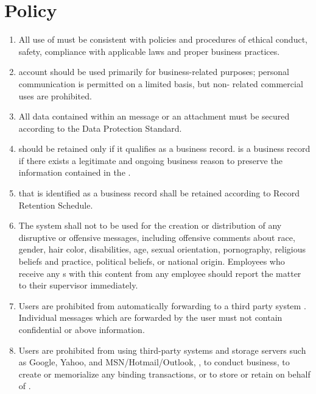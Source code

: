 \section{Policy}
\begin{enumerate}
\item 
All use of \email{} must be consistent with \CompanyName{} policies and procedures of ethical conduct, safety, compliance with applicable laws\oxford{} and proper business practices.
\item 
\CompanyName{} \email{} account should be used primarily for \CompanyName{} business-related purposes; personal communication is permitted on a limited basis, but non-\CompanyName{} related commercial uses are prohibited.
\item 
All \CompanyName{} data contained within an \email{} message or an attachment must be secured according to the Data Protection Standard.%
\item 
\Email{} should be retained only if it qualifies as a \CompanyName{} business record.  
\Email{} is a \CompanyName{} business record if there exists a legitimate and ongoing business reason to preserve the information contained in the \email{}.
\item 
\Email{} that is identified as a \CompanyName{} business record shall be retained according to \CompanyName{} Record Retention Schedule. %
\item 
The \CompanyName{} \email{} system shall not to be used for the creation or distribution of any disruptive or offensive messages, including offensive comments about race, gender, hair color, disabilities, age, sexual orientation, pornography, religious beliefs and practice, political beliefs, or national origin.  
Employees who receive any \email{}s with this content from any \CompanyName{} employee should report the matter to their supervisor immediately.
\item 
Users are prohibited from automatically forwarding \CompanyName{} \email{} to a third party \email{} system .  
Individual messages which are forwarded by the user must not contain \CompanyName{} confidential or above information.
\item \label{G:EmP:P:1}
Users are prohibited from using third-party \email{} systems and storage servers such as Google, Yahoo, and MSN/Hotmail/Outlook, \etc, to conduct \CompanyName{} business, to create or memorialize any binding transactions, or to store or retain \email{} on behalf of \CompanyName{}.  

\end{enumerate}
